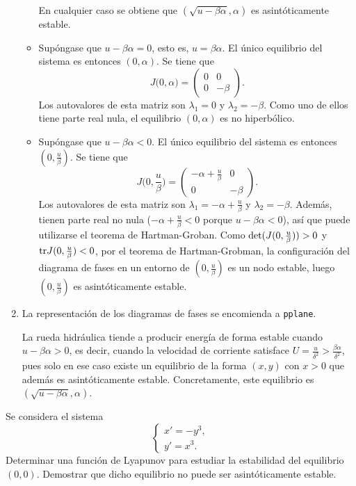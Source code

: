 \documentclass[11pt]{report}
\begin{document}
\begin{solution}
\begin{enumerate}
\begin{itemize}
\begin{itemize}
            \end{itemize}
            En cualquier caso se obtiene que $(\sqrt{u-\beta\alpha},\alpha)$ es asintóticamente estable.
            \item Supóngase que $u-\beta\alpha = 0$, esto es, $u = \beta\alpha$. El único equilibrio del sistema es entonces $(0,\alpha)$. Se tiene que
            \[J\bigl(0,\alpha\bigr) = \left(\begin{array}{cc}
            0 & 0 \\
            0 & -\beta
            \end{array}\right).\]
            Los autovalores de esta matriz son $\lambda_1 = 0$ y $\lambda_2= -\beta$. Como uno de ellos tiene parte real nula, el equilibrio $(0,\alpha)$ es no hiperbólico.
            \item Supóngase que $u-\beta\alpha < 0$. El único equilibrio del sistema es entonces $(0,\frac{u}{\beta})$. Se tiene que
            \[J\bigl(0,\frac{u}{\beta}\bigr) = \left(\begin{array}{cc}
            -\alpha+\frac{u}{\beta} & 0 \\
            0 & -\beta
            \end{array}\right).\]
            Los autovalores de esta matriz son $\lambda_1 = -\alpha+\frac{u}{\beta}$ y $\lambda_2= -\beta$. Además, tienen parte real no nula ($-\alpha+\frac{u}{\beta} <0$ porque $u-\beta\alpha<0$), así que puede utilizarse el teorema de Hartman-Groban. Como $\textup{det}(J(0,\frac{u}{\beta})) >0$ y $\textup{tr}J(0,\frac{u}{\beta}) < 0$, por el teorema de Hartman-Grobman, la configuración del diagrama de fases en un entorno de $(0,\frac{u}{\beta})$ es un nodo estable, luego $(0,\frac{u}{\beta})$ es asintóticamente estable.
        \end{itemize}
        \item La representación de los diagramas de fases se encomienda a \texttt{pplane}. 
        
        La rueda hidráulica tiende a producir energía de forma estable cuando $u-\beta\alpha > 0$, es decir, cuando la velocidad de corriente satisface $U = \frac{u}{\delta^2} > \frac{\beta\alpha}{\delta^2}$, pues solo en ese caso existe un equilibrio de la forma $(x,y)$ con $x >0$ que además es asintóticamente estable. Concretamente, este equilibrio es $(\sqrt{u-\beta\alpha},\alpha)$.
    \end{enumerate}
\end{solution}

\begin{exercise}[Junio de 2024]
    Se considera el sistema
    \[\begin{cases}
        x' = -y^3, \\
        y' = x^3.
    \end{cases}\]
    Determinar una función de Lyapunov para estudiar la estabilidad del equilibrio $(0,0)$. Demostrar que dicho equilibrio no puede ser asintóticamente estable.
\end{exercise}
\end{document}
